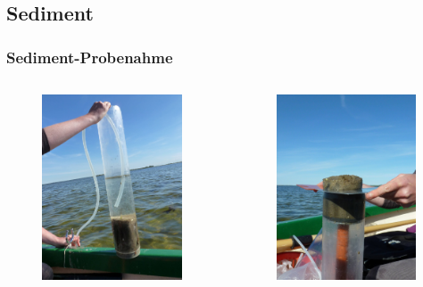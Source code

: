 \documentclass[xcolor=dvipsnames]{beamer}
\begin{document}
\subsection{Sediment}
\begin{frame}
\frametitle{Sediment-Probenahme}
\begin{columns}
\begin{column}{6.4cm}
\begin{figure}
\includegraphics[height=55mm]{images/Fotos/Sedimentstechen.jpg}
\hspace*{-8mm}
\end{figure}
\end{column}
\begin{column}{6.4cm}
\begin{figure}
\includegraphics[height=55mm]{images/Fotos/Stempeln.jpg}
\hspace*{+8mm}
\end{figure}
\end{column}
\end{columns}
\end{frame}
\end{document}
